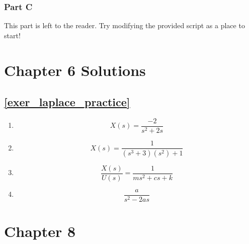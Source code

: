 \subsubsection{Part C}
This part is left to the reader. Try modifying the provided script as a place to start!

\section{Chapter 6 Solutions}

\subsection*{\texorpdfstring{\autoref{exer_laplace_practice}}{Laplace Practice}}

\begin{enumerate}
    \item $$X(s)=\frac{-2}{s^2+2s}$$
    \item $$X(s)=\frac{1}{(s^3+3)(s^2)+1}$$
    \item $$\frac{X(s)}{U(s)}=\frac{1}{ms^2+cs+k}$$
    \item $$\frac{a}{s^2-2as}$$
\end{enumerate}

\section{Chapter 8}
